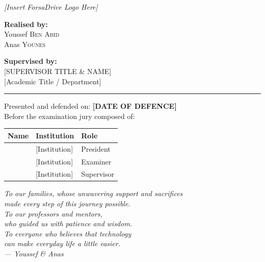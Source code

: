 \documentclass[12pt,a4paper,openright]{report}
\begin{document}
\begin{titlepage}
\begin{center}
\begin{center}
\textit{[Insert ForsaDrive Logo Here]}
\end{center}

\vspace{0.6cm}

\begin{minipage}{0.48\textwidth}
\centering
{\large \textbf{Realised by:}}\\[0.2cm]
{\large Youssef \textsc{Ben Abid}}\\[0.1cm]
{\large Anas \textsc{Younes}}
\end{minipage}
\hfill
\begin{minipage}{0.48\textwidth}
\centering
{\large \textbf{Supervised by:}}\\[0.2cm]
{\large [SUPERVISOR TITLE \& NAME]}\\[0.1cm]
{\small [Academic Title / Department]}
\end{minipage}

\vspace{0.6cm}
\noindent\rule{\textwidth}{0.8pt}
\vspace{0.3cm}

{\normalsize Presented and defended on: \textbf{[DATE OF DEFENCE]}}\\[0.2cm]
{\normalsize Before the examination jury composed of:}

\vspace{0.3cm}
\begin{tabular}{lll}
\toprule
\textbf{Name} & \textbf{Institution} & \textbf{Role} \\
\midrule
[JURY PRESIDENT NAME] & [Institution] & President \\
[EXAMINER 1 NAME]     & [Institution] & Examiner \\
[SUPERVISOR NAME]     & [Institution] & Supervisor \\
\bottomrule
\end{tabular}

\end{center}
\end{titlepage}

\cleardoublepage
\thispagestyle{empty}
\vspace*{5cm}
\begin{flushright}
\itshape\large
To our families, whose unwavering support and sacrifices\\
made every step of this journey possible.\\[0.5cm]
To our professors and mentors,\\
who guided us with patience and wisdom.\\[0.5cm]
To everyone who believes that technology\\
can make everyday life a little easier.\\[1cm]
--- Youssef \& Anas
\end{flushright}
\end{document}
